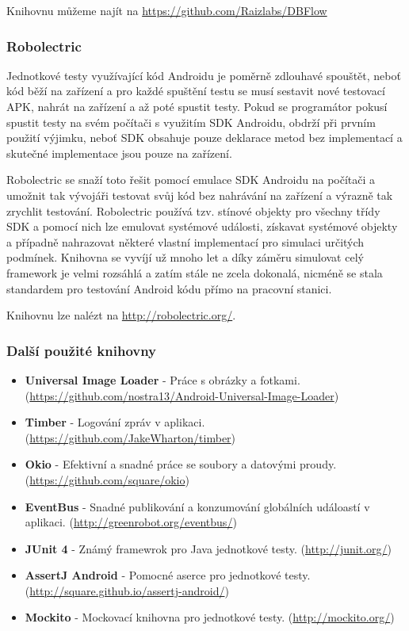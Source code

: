 \documentclass{article}
\begin{document}
  Knihovnu můžeme najít na \url{https://github.com/Raizlabs/DBFlow}


\subsubsection{Robolectric}
Jednotkové testy využívající kód Androidu je poměrně zdlouhavé spouštět, neboť kód běží na
zařízení a pro každé spuštění testu se musí sestavit nové testovací APK, nahrát na zařízení
a až poté spustit testy. Pokud se programátor pokusí spustit testy na svém počítači s využitím
SDK Androidu, obdrží při prvním použití výjimku, neboť SDK obsahuje pouze deklarace metod
bez implementací a skutečné implementace jsou pouze na zařízení.

Robolectric se snaží toto řešit pomocí emulace SDK Androidu na počítači a umožnit tak vývojáři
testovat svůj kód bez nahrávání na zařízení a výrazně tak zrychlit testování. Robolectric
používá tzv. stínové objekty pro všechny třídy SDK a pomocí nich lze emulovat systémové události,
získavat systémové objekty a případně nahrazovat některé vlastní implementací pro simulaci
určitých podmínek. Knihovna se vyvíjí už mnoho let a díky záměru simulovat celý framework je velmi
rozsáhlá a zatím stále ne zcela dokonalá, nicméně se stala standardem pro testování Android kódu
přímo na pracovní stanici.

Knihovnu lze nalézt na \url{http://robolectric.org/}.

\subsubsection{Další použité knihovny}
\begin{itemize}
  \item \textbf{Universal Image Loader} - Práce s obrázky a fotkami. (\url{https://github.com/nostra13/Android-Universal-Image-Loader})
  \item \textbf{Timber} - Logování zpráv v aplikaci. (\url{https://github.com/JakeWharton/timber})
  \item \textbf{Okio} - Efektivní a snadné práce se soubory a datovými proudy. (\url{https://github.com/square/okio})
  \item \textbf{EventBus} - Snadné publikování a konzumování globálních událoastí v aplikaci. (\url{http://greenrobot.org/eventbus/})
  \item \textbf{JUnit 4} - Známý framewrok pro Java jednotkové testy. (\url{http://junit.org/})
  \item \textbf{AssertJ Android} - Pomocné aserce pro jednotkové testy. (\url{http://square.github.io/assertj-android/})
  \item \textbf{Mockito} - Mockovací knihovna pro jednotkové testy. (\url{http://mockito.org/})
\end{itemize}
\end{document}
